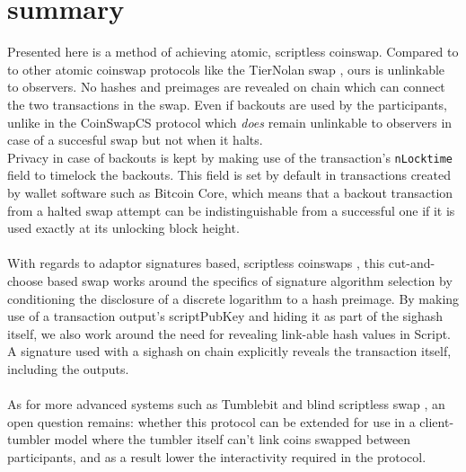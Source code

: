 \documentclass[12pt,a4paper]{article}
\begin{document}
\section{summary}
Presented here is a method of achieving atomic, scriptless coinswap.  Compared to to other atomic coinswap protocols like the TierNolan swap \cite{tiernolan}, ours is unlinkable to observers. No hashes and preimages are revealed on chain which can connect the two transactions in the swap.  Even if backouts are used by the participants, unlike in the CoinSwapCS \cite{coinswapcs} protocol which \textit{does} remain unlinkable to observers in case of a succesful swap but not when it halts.
\\
Privacy in case of backouts is kept by making use of the transaction's \texttt{nLocktime} field to timelock the backouts.  This field is set by default in transactions created by wallet software such as Bitcoin Core, which means that a backout transaction from a halted swap attempt can be indistinguishable from a successful one if it is used exactly at its unlocking block height.
\\ \\
With regards to adaptor signatures based, scriptless coinswaps \cite{andytoshi}, this cut-and-choose based swap works around the specifics of signature algorithm selection by conditioning the disclosure of a discrete logarithm to a hash preimage.  By making use of a transaction output's scriptPubKey and hiding it as part of the sighash itself, we also work around the need for revealing link-able hash values in Script. A signature used with a sighash on chain explicitly reveals the transaction itself, including the outputs.
\\ \\
As for more advanced systems such as Tumblebit \cite{tumblebit} and blind scriptless swap \cite{nickler}, an open question remains: whether this protocol can be extended for use in a client-tumbler model where the tumbler itself can't link coins swapped between participants, and as a result lower the interactivity required in the protocol.
\end{document}
